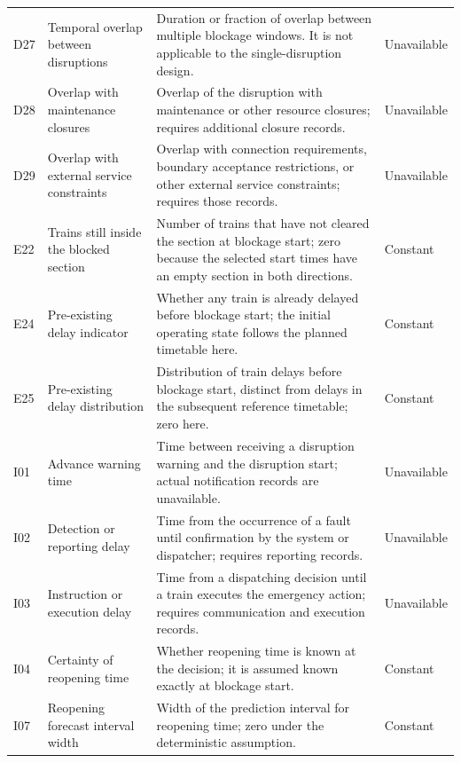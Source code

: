 \begin{longtable}{@{}>{\raggedright\arraybackslash}p{0.7cm}>{\raggedright\arraybackslash}p{3.0cm}>{\raggedright\arraybackslash}p{8.6cm}>{\raggedright\arraybackslash}p{1.9cm}@{}}
D27 & Temporal overlap between disruptions & Duration or fraction of overlap between multiple blockage windows. It is not applicable to the single-disruption design. & Unavailable \\

D28 & Overlap with maintenance closures & Overlap of the disruption with maintenance or other resource closures; requires additional closure records. & Unavailable \\

D29 & Overlap with external service constraints & Overlap with connection requirements, boundary acceptance restrictions, or other external service constraints; requires those records. & Unavailable \\

E22 & Trains still inside the blocked section & Number of trains that have not cleared the section at blockage start; zero because the selected start times have an empty section in both directions. & Constant \\

E24 & Pre-existing delay indicator & Whether any train is already delayed before blockage start; the initial operating state follows the planned timetable here. & Constant \\

E25 & Pre-existing delay distribution & Distribution of train delays before blockage start, distinct from delays in the subsequent reference timetable; zero here. & Constant \\

I01 & Advance warning time & Time between receiving a disruption warning and the disruption start; actual notification records are unavailable. & Unavailable \\

I02 & Detection or reporting delay & Time from the occurrence of a fault until confirmation by the system or dispatcher; requires reporting records. & Unavailable \\

I03 & Instruction or execution delay & Time from a dispatching decision until a train executes the emergency action; requires communication and execution records. & Unavailable \\

I04 & Certainty of reopening time & Whether reopening time is known at the decision; it is assumed known exactly at blockage start. & Constant \\

I07 & Reopening forecast interval width & Width of the prediction interval for reopening time; zero under the deterministic assumption. & Constant \\


\end{longtable}
